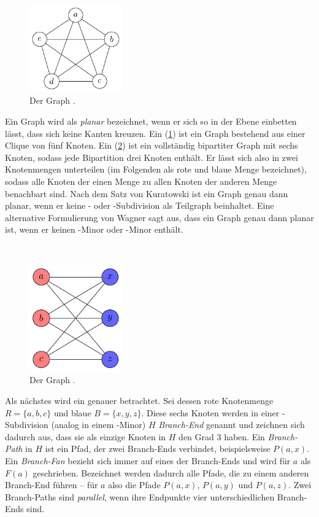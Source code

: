 \begin{figure}
  \includegraphics[width=4cm]{bilder/K_5.pdf}
  \caption{Der Graph \kf.}
  \label{fig:K5}
\end{figure}
Ein Graph wird als \emph{planar} bezeichnet, wenn er sich so in der Ebene einbetten lässt, dass sich keine Kanten kreuzen.
Ein \kf (\sAbb \ref{fig:K5}) ist ein Graph bestehend aus einer Clique von fünf Knoten.
Ein \kdd (\sAbb \ref{fig:K33}) ist ein vollständig bipartiter Graph mit sechs Knoten, sodass jede Bipartition drei Knoten enthält.
Er lässt sich also in zwei Knotenmengen unterteilen (im Folgenden als rote und blaue Menge bezeichnet), sodass alle Knoten der einen Menge zu allen Knoten der anderen Menge benachbart sind.
Nach dem Satz von Kuratowski \cite{Kur30} ist ein Graph genau dann planar, wenn er keine \kf- oder \kdd-Subdivision als Teilgraph beinhaltet.
Eine alternative Formulierung von Wagner \cite{Wag37} sagt aus, dass ein Graph genau dann planar ist, wenn er keinen \kf-Minor oder \kdd-Minor enthält\cite{Die12}.

\ \\
\begin{figure}
  \includegraphics[width=4cm]{bilder/K_33.pdf}
  \caption{Der Graph \kdd.}
  \label{fig:K33}
\end{figure}
Als nächstes wird ein \kdd genauer betrachtet.
Sei dessen rote Knotenmenge $R = \{a, b, c\}$ und blaue $B = \{x, y, z\}$.
Diese sechs Knoten werden in einer \kdd-Subdivision (analog in einem \kdd-Minor) $H$ \emph{Branch-End} genannt und zeichnen sich dadurch aus, dass sie als einzige Knoten in $H$ den Grad 3 haben.
Ein \emph{Branch-Path} in $H$ ist ein Pfad, der zwei Branch-Ends verbindet, beispielsweise $P(a, x)$.
Ein \emph{Branch-Fan} bezieht sich immer auf eines der Branch-Ends und wird \zB für $a$ als $F(a)$ geschrieben.
Bezeichnet werden dadurch alle Pfade, die zu einem anderen Branch-End führen -- für $a$ also die Pfade $P(a, x)$, $P(a, y)$ und $P(a, z)$.
Zwei Branch-Paths sind \emph{parallel}, wenn ihre Endpunkte vier unterschiedlichen Branch-Ends sind.


